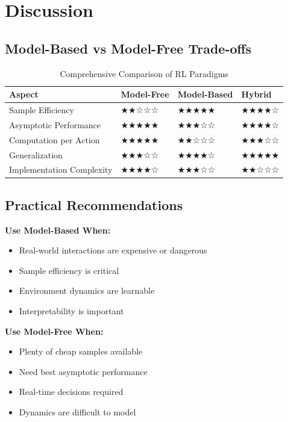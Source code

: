 \documentclass[12pt]{article}
\numberwithin{equation}{section}
\numberwithin{figure}{section}
\numberwithin{table}{section}
\numberwithin{algorithm}{section}
\begin{document}
{{{%
\section{Discussion}

\subsection{Model-Based vs Model-Free Trade-offs}

\begin{table}[H]
\centering
\caption{Comprehensive Comparison of RL Paradigms}
\begin{tabular}{|l|l|l|l|}
\hline
\textbf{Aspect} & \textbf{Model-Free} & \textbf{Model-Based} & \textbf{Hybrid} \\
\hline
Sample Efficiency & ★★☆☆☆ & ★★★★★ & ★★★★☆ \\
Asymptotic Performance & ★★★★★ & ★★★☆☆ & ★★★★☆ \\
Computation per Action & ★★★★★ & ★★☆☆☆ & ★★★☆☆ \\
Generalization & ★★★☆☆ & ★★★★☆ & ★★★★★ \\
Implementation Complexity & ★★★★☆ & ★★★☆☆ & ★★☆☆☆ \\
\hline
\end{tabular}
\end{table}

\subsection{Practical Recommendations}

\textbf{Use Model-Based When:}
\begin{itemize}
    \item Real-world interactions are expensive or dangerous
    \item Sample efficiency is critical
    \item Environment dynamics are learnable
    \item Interpretability is important
\end{itemize}

\textbf{Use Model-Free When:}
\begin{itemize}
    \item Plenty of cheap samples available
    \item Need best asymptotic performance
    \item Real-time decisions required
    \item Dynamics are difficult to model
\end{itemize}

}}}
\end{document}

